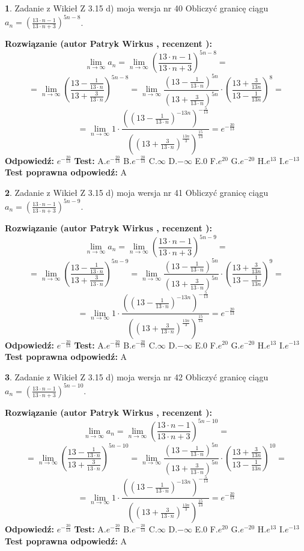 \documentclass[12pt, a4paper]{article}
\theoremstyle{definition} %
\newtheorem{zad}{}
\newcommand{\zadStart}[1]{\begin{zad}#1\newline}
\newcommand{\zadStop}{\end{zad}}
\newcommand{\rozwStart}[2]{\noindent \textbf{Rozwiązanie (autor #1 , recenzent #2): }\newline}
\newcommand{\rozwStop}{\newline}
\newcommand{\odpStart}{\noindent \textbf{Odpowiedź:}\newline}
\newcommand{\odpStop}{\newline}
\newcommand{\testStart}{\noindent \textbf{Test:}\newline}
\newcommand{\testStop}{\newline}
\newcommand{\kluczStart}{\noindent \textbf{Test poprawna odpowiedź:}\newline}
\newcommand{\kluczStop}{\newline}
\begin{document}
\zadStart{Zadanie z Wikieł Z 3.15 d) moja wersja nr 40}
Obliczyć granicę ciągu $a_{n}=(\frac{13\cdot n - 1}{13 \cdot n + 3})^{5n-8}$.
\zadStop
\rozwStart{Patryk Wirkus}{}
$$\lim\limits_{n\to\infty} a_{n} = \lim\limits_{n\to\infty}(\frac{13\cdot n - 1}{13 \cdot n + 3})^{5n-8}=$$
$$=\lim\limits_{n\to\infty}(\frac{13 - \frac{1}{13\cdot n}}{13 + \frac{3}{13 \cdot n}})^{5n-8}=\lim\limits_{n\to\infty}\frac{(13 - \frac{1}{13\cdot n})^{5n}}{(13 + \frac{3}{13\cdot n})^{5n}} \cdot (\frac{13+\frac{3}{13n}}{13-\frac{1}{13n}})^{8}=$$
$$=\lim\limits_{n\to\infty} 1 \cdot \frac{((13-\frac{1}{13 \cdot n})^{-13n})^{-\frac{5}{13}}}{((13+\frac{3}{13 \cdot n})^{\frac{13n}{3}})^{\frac{15}{13}}} =e^{-\frac{20}{13}}$$
\rozwStop
\odpStart
$e^{-\frac{20}{13}}$
\odpStop
\testStart
A.$ e^{-\frac{20}{13}}$
B.$ e^{-\frac{20}{13}}$
C.$\infty$
D.$-\infty$
E.$0$
F.$e^{20}$
G.$e^{-20}$
H.$e^{13}$
I.$e^{-13}$
\testStop
\kluczStart
A
\kluczStop



\zadStart{Zadanie z Wikieł Z 3.15 d) moja wersja nr 41}
Obliczyć granicę ciągu $a_{n}=(\frac{13\cdot n - 1}{13 \cdot n + 3})^{5n-9}$.
\zadStop
\rozwStart{Patryk Wirkus}{}
$$\lim\limits_{n\to\infty} a_{n} = \lim\limits_{n\to\infty}(\frac{13\cdot n - 1}{13 \cdot n + 3})^{5n-9}=$$
$$=\lim\limits_{n\to\infty}(\frac{13 - \frac{1}{13\cdot n}}{13 + \frac{3}{13 \cdot n}})^{5n-9}=\lim\limits_{n\to\infty}\frac{(13 - \frac{1}{13\cdot n})^{5n}}{(13 + \frac{3}{13\cdot n})^{5n}} \cdot (\frac{13+\frac{3}{13n}}{13-\frac{1}{13n}})^{9}=$$
$$=\lim\limits_{n\to\infty} 1 \cdot \frac{((13-\frac{1}{13 \cdot n})^{-13n})^{-\frac{5}{13}}}{((13+\frac{3}{13 \cdot n})^{\frac{13n}{3}})^{\frac{15}{13}}} =e^{-\frac{20}{13}}$$
\rozwStop
\odpStart
$e^{-\frac{20}{13}}$
\odpStop
\testStart
A.$ e^{-\frac{20}{13}}$
B.$ e^{-\frac{20}{13}}$
C.$\infty$
D.$-\infty$
E.$0$
F.$e^{20}$
G.$e^{-20}$
H.$e^{13}$
I.$e^{-13}$
\testStop
\kluczStart
A
\kluczStop



\zadStart{Zadanie z Wikieł Z 3.15 d) moja wersja nr 42}
Obliczyć granicę ciągu $a_{n}=(\frac{13\cdot n - 1}{13 \cdot n + 3})^{5n-10}$.
\zadStop
\rozwStart{Patryk Wirkus}{}
$$\lim\limits_{n\to\infty} a_{n} = \lim\limits_{n\to\infty}(\frac{13\cdot n - 1}{13 \cdot n + 3})^{5n-10}=$$
$$=\lim\limits_{n\to\infty}(\frac{13 - \frac{1}{13\cdot n}}{13 + \frac{3}{13 \cdot n}})^{5n-10}=\lim\limits_{n\to\infty}\frac{(13 - \frac{1}{13\cdot n})^{5n}}{(13 + \frac{3}{13\cdot n})^{5n}} \cdot (\frac{13+\frac{3}{13n}}{13-\frac{1}{13n}})^{10}=$$
$$=\lim\limits_{n\to\infty} 1 \cdot \frac{((13-\frac{1}{13 \cdot n})^{-13n})^{-\frac{5}{13}}}{((13+\frac{3}{13 \cdot n})^{\frac{13n}{3}})^{\frac{15}{13}}} =e^{-\frac{20}{13}}$$
\rozwStop
\odpStart
$e^{-\frac{20}{13}}$
\odpStop
\testStart
A.$ e^{-\frac{20}{13}}$
B.$ e^{-\frac{20}{13}}$
C.$\infty$
D.$-\infty$
E.$0$
F.$e^{20}$
G.$e^{-20}$
H.$e^{13}$
I.$e^{-13}$
\testStop
\kluczStart
A
\kluczStop
\end{document}
